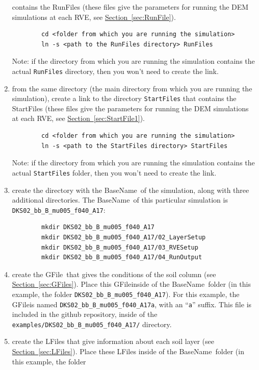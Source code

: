 \documentclass[letterpaper,11pt]{article}
\newcommand{\RunFile}{\textsf{RunFile}}
\newcommand{\StartFile}{\textsf{StartFile}}
\newcommand{\BaseName}{\textsf{BaseName}}
\newcommand{\GFile}{\textsf{GFile}}
\newcommand{\LFile}{\textsf{LFile}}
\begin{document}
\begin{enumerate}
	contains the \RunFile s (these files give the parameters for running
	the DEM simulations at each RVE, see
	\hyperref[sec:RunFile]{Section~\ref*{sec:RunFile}}).
	\begin{verbatim}
		cd <folder from which you are running the simulation>
		ln -s <path to the RunFiles directory> RunFiles
	\end{verbatim}
	Note: if the directory
	from which you are running the simulation contains
	the actual \texttt{RunFiles} directory,
	then you won't need to create the link.
	\item
	from the same directory
	(the main directory from which you are running 
	the simulation),
	create a link to the directory \texttt{StartFiles} that
	contains the \StartFile s (these files give the parameters for running
	the DEM simulations at each RVE,
	see \hyperref[sec:StartFile1]{Section~\ref*{sec:StartFile1}}).
	\begin{verbatim}
		cd <folder from which you are running the simulation>
		ln -s <path to the StartFiles directory> StartFiles
	\end{verbatim}
	Note: if the directory
	from which you are running the simulation contains
	the actual \texttt{StartFiles} folder,
	then you won't need to create the link.
	\item
	create the directory with the \BaseName\ of the simulation, along with
	three additional directories.
	The \BaseName\ of this particular simulation is 
	\texttt{DKS02\_bb\_B\_mu005\_f040\_A17}:
	\begin{verbatim}
		mkdir DKS02_bb_B_mu005_f040_A17
		mkdir DKS02_bb_B_mu005_f040_A17/02_LayerSetup
		mkdir DKS02_bb_B_mu005_f040_A17/03_RVESetup
		mkdir DKS02_bb_B_mu005_f040_A17/04_RunOutput
	\end{verbatim}
	\item
	create the \GFile\ that gives the conditions of the soil column
	(see \hyperref[sec:GFiles]{Section~\ref*{sec:GFiles}}).
	Place this \GFile inside of the \BaseName\ folder
	(in this example, the folder
	\texttt{DKS02\_bb\_B\_mu005\_f040\_A17}). 
	For this example,
	the \GFile is named
	\texttt{DKS02\_bb\_B\_mu005\_f040\_A17a},
	with an ``\texttt{a}'' suffix.
	This file is included 
	in the github repository, inside of the 
	\texttt{examples/DKS02\_bb\_B\_mu005\_f040\_A17/} directory.
	\item
	create the \LFile s that give information about each soil layer
	(see \hyperref[sec:LFiles]{Section~\ref*{sec:LFiles}}).
	Place these \LFile s inside of the \BaseName\ folder
	(in this example, the folder

\end{enumerate}
\end{document}
